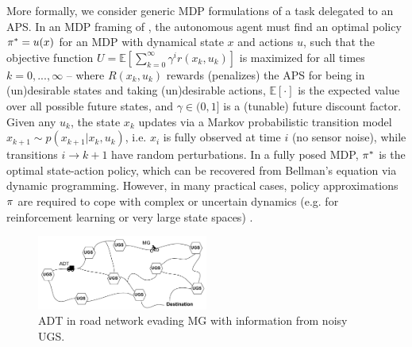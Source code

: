 More formally, we consider generic MDP formulations of a task \task{} delegated to an APS. In an MDP framing of \task{}, the autonomous agent must find an optimal policy $\mathcal{\pi^*} = u(x)$ for an MDP with dynamical state $x$ and actions $u$, such that the objective function
$U = \mathbb{E} \left[\sum_{k=0}^{\infty} \gamma^i r(x_k,u_k) \right]$ is maximized for all times $k=0,...,\infty$ --  
where $R(x_k,u_k)$ rewards (penalizes) the APS for being in (un)desirable states and taking (un)desirable actions, $\mathbb{E}[\cdot]$ is the expected value over all possible future states, and $\gamma \in (0,1]$ is a (tunable) future discount factor. 
Given any $u_k$, the state $x_k$ updates via a Markov probabilistic transition model $x_{k+1} \sim p(x_{k+1}|x_{k},u_{k})$,  
i.e. $x_{i}$ is fully observed at time $i$ (no sensor noise), while transitions $i\rightarrow k+1$ have random perturbations.
In a fully posed MDP, $\mathcal{\pi^*}$ is the optimal state-action policy, which can be recovered from Bellman's equation via dynamic programming. 
However, in many practical cases, policy approximations $\mathcal{\pi}$ are required to cope with complex or uncertain dynamics (e.g. for reinforcement learning or very large state spaces) \cite{Kochenderfer2015-uu}. 
    
    
	\begin{figure}[t]%
    	\centering
     	\includegraphics[width=0.5\textwidth]{Figures/RoadNet}
    	\caption{ADT in road network evading MG with information from noisy UGS.} 
        \label{fig:RoadNet}
        \vspace{-0.2cm}
    \end{figure}    
    
